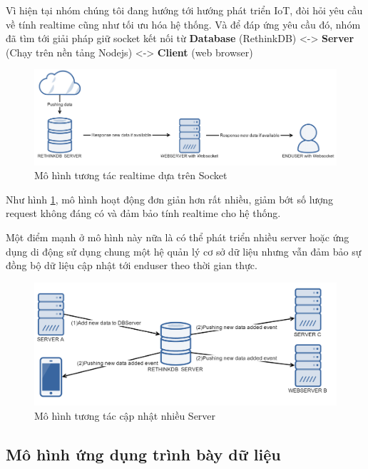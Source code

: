 Vì hiện tại nhóm chúng tôi đang hướng tới hướng phát triển IoT, đòi hỏi yêu cầu về tính realtime cũng như tối ưu hóa hệ thống. Và để đáp ứng yêu cầu đó, nhóm đã tìm tới giải pháp giữ socket kết nối từ \textbf{Database} (RethinkDB) <-> \textbf{Server} (Chạy trên nền tảng Nodejs) <-> \textbf{Client} (web browser)

\begin{figure}[H]
	\centering    
	\includegraphics[width=1.0\textwidth]{realtime}
	\caption[Mô hình tương tác realtime dựa trên Socket]{Mô hình tương tác realtime dựa trên Socket}
	\label{fig: realtime}
\end{figure}

Như hình \ref{fig: realtime}, mô hình hoạt động đơn giản hơn rất nhiều, giảm bớt số lượng request không đáng có và đảm bảo tính realtime cho hệ thống.

Một điểm mạnh ở mô hình này nữa là có thể phát triển nhiều server hoặc ứng dụng di động sử dụng chung một hệ quản lý cơ sở dữ liệu nhưng vẫn đảm bảo sự đồng bộ dữ liệu cập nhật tới enduser theo thời gian thực.
\begin{figure}[H]
	\centering    
	\includegraphics[width=1.0\textwidth]{multiserver}
	\caption[Mô hình tương tác cập nhật nhiều Server]{Mô hình tương tác cập nhật nhiều Server}
	\label{fig: multiserver}
\end{figure}






\newpage
\subsection{Mô hình ứng dụng trình bày dữ liệu}
